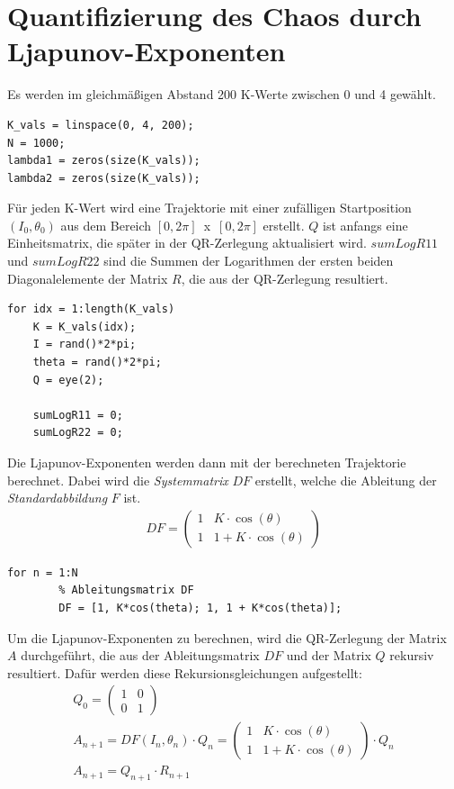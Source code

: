 \documentclass[paper=a4, 
                DIV=12]{scrartcl}
\begin{document}
\section{Quantifizierung des Chaos durch Ljapunov-Exponenten}
Es werden im gleichmäßigen Abstand 200 K-Werte zwischen 0 und 4 gewählt. 
\begin{lstlisting}[frame=single, style=Matlab-editor]
K_vals = linspace(0, 4, 200);
N = 1000;
lambda1 = zeros(size(K_vals));
lambda2 = zeros(size(K_vals));
\end{lstlisting}
Für jeden K-Wert wird eine Trajektorie mit einer zufälligen Startposition $(I_0, \theta_0)$ aus dem Bereich \hbox{$[0,2\pi]$ x $[0,2\pi]$} erstellt.
$Q$ ist anfangs eine Einheitsmatrix, die später in der QR-Zerlegung aktualisiert wird. $sumLogR11$ und $sumLogR22$ sind die Summen der Logarithmen der ersten beiden Diagonalelemente der Matrix $R$, die aus der QR-Zerlegung resultiert.
\begin{lstlisting}[frame=single, style=Matlab-editor]
for idx = 1:length(K_vals)
    K = K_vals(idx);
    I = rand()*2*pi;
    theta = rand()*2*pi;
    Q = eye(2);
    
    sumLogR11 = 0;
    sumLogR22 = 0;
\end{lstlisting}
Die Ljapunov-Exponenten werden dann mit der berechneten Trajektorie berechnet. 
Dabei wird die \textit{Systemmatrix} $DF$ erstellt, welche die Ableitung der \textit{Standardabbildung} $F$ ist.
\begin{gather*}
    DF = \begin{pmatrix}
        1 & K \cdot \cos(\theta) \\
        1 & 1 + K \cdot \cos(\theta)
    \end{pmatrix}
\end{gather*}
\begin{lstlisting}[frame=single, style=Matlab-editor]
    for n = 1:N
        % Ableitungsmatrix DF
        DF = [1, K*cos(theta); 1, 1 + K*cos(theta)];
\end{lstlisting}
Um die Ljapunov-Exponenten zu berechnen, wird die QR-Zerlegung der Matrix $A$ durchgeführt, die aus der Ableitungsmatrix $DF$ und der Matrix $Q$  rekursiv resultiert.
Dafür werden diese Rekursionsgleichungen aufgestellt:
\begin{gather*}
    Q_0 =
    \begin{pmatrix}
        1 & 0 \\
        0 & 1
    \end{pmatrix} \\
    A_{n+1} = DF(I_n, \theta_n) \cdot Q_n = 
    \begin{pmatrix}
        1 & K \cdot \cos(\theta) \\
        1 & 1 + K \cdot \cos(\theta)
    \end{pmatrix} \cdot Q_n \\
    A_{n+1} = Q_{n+1} \cdot R_{n+1}
\end{gather*}
\end{document}
